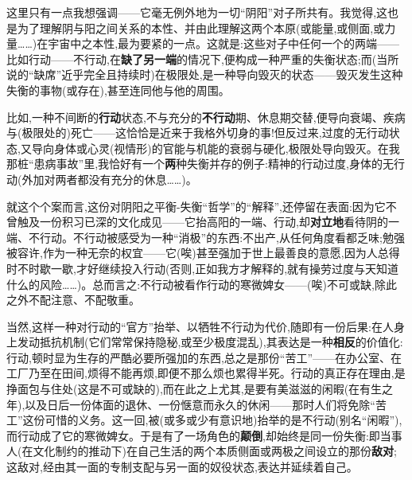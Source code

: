 这里只有一点我想强调——它毫无例外地为一切“阴阳”对子所共有。我觉得,这也是为了理解阴与阳之间关系的本性、并由此理解这两个本原(或能量,或侧面,或力量……)在宇宙中之本性,最为要紧的一点。这就是:这些对子中任何一个的两端——比如行动——不行动,在\textbf{缺了另一端}的情况下\dmark{},便构成一种严重的失衡状态;而(当所说的“缺席”近乎完全且持续时)在极限处,是一种导向毁灭的状态——毁灭发生这种失衡的事物(或存在),甚至连同他与他的周围。

比如,一种不间断的\textbf{行动}状态,不与充分的\textbf{不行动}期、休息期交替,便导向衰竭、疾病与(极限处的)死亡——这恰恰是近来于我格外切身的事!但反过来,过度的无行动状态,又导向身体或心灵(视情形)的官能与机能的衰弱与硬化,极限处导向毁灭。在我那桩“患病事故”里,我恰好有一个\textbf{两}种失衡并存的例子:精神的行动过度,身体的无行动(外加对两者都没有充分的休息……)。

就这个个案而言,这份对阴阳之平衡-失衡“哲学”的“解释”,还停留在表面:因为它不曾触及一份积习已深的文化成见——它抬高阳的一端、行动,却\textbf{对立地}看待阴的一端、不行动。不行动被感受为一种“消极”的东西:不出产,从任何角度看都乏味;勉强被容许,作为一种无奈的权宜——它(唉)甚至强加于世上最善良的意愿,因为人总得时不时歇一歇,才好继续投入行动(否则,正如我方才解释的,就有操劳过度与天知道什么的风险……)。总而言之:不行动被看作行动的寒微婢女——(唉)不可或缺,除此之外不配注意、不配敬重。

\dmark{}当然,这样一种对行动的“官方”抬举、以牺牲不行动为代价,随即有一份后果:在人身上发动抵抗机制(它们常常保持隐秘,或至少极度混乱),其表达是一种\textbf{相反}的价值化:行动,顿时显为生存的严酷必要所强加的东西,总之是那份“苦工”——在办公室、在工厂乃至在田间,烦得不能再烦,即便不那么烦也累得半死。行动的真正存在理由,是挣面包与住处(这是不可或缺的),而在此之上尤其,是要有美滋滋的闲暇(在有生之年),以及日后一份体面的退休、一份惬意而永久的休闲——那时人们将免除“苦工”这份可惜的义务。这一回,被(或多或少有意识地)抬举的是不行动(别名“闲暇”),而行动成了它的寒微婢女。于是有了一场角色的\textbf{颠倒},却始终是同一份失衡:即当事人(在文化制约的推动下)在自己生活的两个本质侧面或两极之间设立的那份\textbf{敌对};这敌对,经由其一面的专制支配与另一面的奴役状态,表达并延续着自己。

